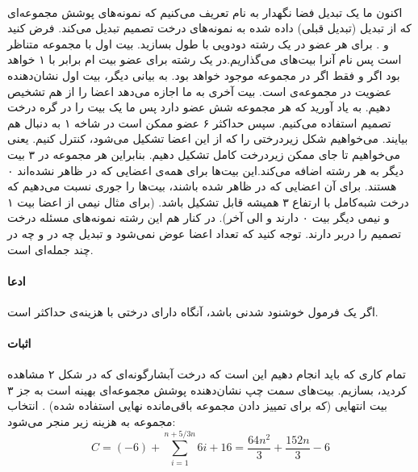 \documentclass[a4paper]{article}
\begin{document}
	\paragraph{}
	اکنون ما یک تبدیل فضا نگهدار به نام
	 تعریف می‌کنیم که نمونه‌های پوشش مجموعه‌ای
	 که از تبدیل 
	(تبدیل قبلی) داده شده به نمونه‌های
	درخت تصمیم تبدیل می‌کند.
	فرض کنید
	و
	.
	برای هر عضو
	در 
	یک رشته دودویی با طول 
	بسازید. 
	بیت اول با
	مجموعه 
	متناظر است پس نام آنرا
	بیت‌های
	می‌گذاریم.در یک رشته برای عضو 
	بیت
	ام برابر با ۱ خواهد بود اگر و فقط اگر 
	در مجموعه
	موجود خواهد بود. به بیانی دیگر، 
	بیت اول نشان‌دهنده عضویت در 
	مجموعه‌ی
	است.
	بیت آخری به ما اجازه می‌دهد اعضا را از هم تشخیص دهیم. به یاد آورید که هر مجموعه شش عضو دارد پس ما یک بیت
	را در گره
	درخت تصمیم استفاده می‌کنیم. سپس حداکثر ۶ عضو ممکن است در شاخه ۱ 
	به دنبال هم بیایند. می‌خواهیم شکل زیردرختی را که از این اعضا تشکیل می‌شود، کنترل کنیم. یعنی می‌خواهیم تا جای
	ممکن زیردرخت کامل تشکیل دهیم. بنابراین هر مجموعه
	در 
	۳ بیت دیگر به هر رشته اضافه می‌کند.این بیت‌ها برای همه‌ی اعضایی که در 
	ظاهر نشده‌اند ۰ هستند. برای آن اعضایی که در 
	ظاهر شده باشند، بیت‌ها را جوری نسبت می‌دهیم که درخت شبه‌کامل با ارتفاع ۳ همیشه قابل تشکیل باشد. (برای مثال نیمی
	از اعضا بیت ۱ و نیمی دیگر بیت ۰ دارند و الی آخر). در کنار هم این 
	 رشته نمونه‌های مسئله درخت تصمیم را دربر دارند. توجه کنید که تعداد اعضا عوض نمی‌شود و تبدیل چه در 
	 و چه در 
	چند جمله‌ای است. 
	\paragraph{ادعا}
	اگر
	\lr{$\phi$}
	یک فرمول
	خوشنود شدنی باشد، آنگاه
	دارای درختی با هزینه‌ی حداکثر
	است.
	\paragraph{اثبات}
	تمام کاری که باید انجام دهیم این است که درخت آبشارگونه‌ای که در شکل ۲ مشاهده کردید، بسازیم. بیت‌های سمت چپ
	نشان‌دهنده پوشش مجموعه‌ای بهینه است به جز ۳ بیت انتهایی (که برای تمییز دادن مجموعه باقی‌مانده نهایی استفاده شده) 
. انتخاب
	مجموعه به هزینه زیر منجر می‌شود:
	\[C=(-6) + \sum_{i=1}^{n+5/3n} 6i +16 = \frac{64n^2}{3}+ \frac{152n}{3} -6 \]
\end{document}

